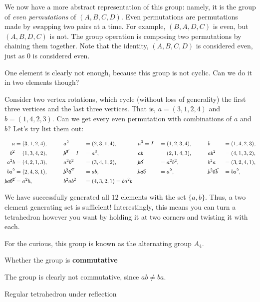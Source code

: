 \documentclass[../gatm_answers.tex]{subfiles}
\begin{document}
\noindent We now have a more abstract representation of this group: namely, it is the group of \textit{even permutations} of $(A,B,C,D)$. Even permutations are permutations made by swapping two pairs at a time. For example, $(B,A,D,C)$ is even, but $(A,B,D,C)$ is not. The group operation is composing two permutations by chaining them together. Note that the identity, $(A,B,C,D)$ is considered even, just as $0$ is considered even.

One element is clearly not enough, because this group is not cyclic. Can we do it in two elements though?

Consider two vertex rotations, which cycle (without loss of generality) the first three vertices and the last three vertices. That is, $a=(3,1,2,4)$ and $b=(1,4,2,3)$. Can we get every even permutation with combinations of $a$ and $b$? Let's try list them out:

\begin{alignat*}{9}
a &=(3,1,2,4), \qquad &&a^2&&=(2,3,1,4), \qquad &&a^3=I&&=(1,2,3,4), \qquad  &&b&&=(1,4,2,3), \\
b^2&=(1,3,4,2), &&\cancel{b^3}=I&&=a^3, &&ab&&=(2,1,4,3), &&ab^2&&=(4,1,3,2), \\
a^2b&=(4,2,1,3), &&a^2b^2&&=(3,4,1,2), &&\cancel{ba}&&=a^2b^2, &&b^2a&&=(3,2,4,1), \\
ba^2&=(2,4,3,1), &&\cancel{b^2a^2}&&=ab, &&\cancel{bab}&&=a^2, &&\cancel{b^2ab}&&=ba^2, \\
\cancel{bab^2}&=a^2b, &&b^2ab^2&&=(4,3,2,1)=ba^2b &&
\end{alignat*}

\noindent We have successfully generated all $12$ elements with the set $\{a,b\}$. Thus, a two element generating set is sufficient! Interestingly, this means you can turn a tetrahedron however you want by holding it at two corners and twisting it with each.

For the curious, this group is known as the alternating group $A_4$.

\begin{inner_problem}
\item Whether the group is \textbf{commutative}
\end{inner_problem}

\noindent The group is clearly not commutative, since $ab\neq ba$.

\begin{outer_problem}
\item Regular tetrahedron under reflection
\end{outer_problem}
\end{document}
